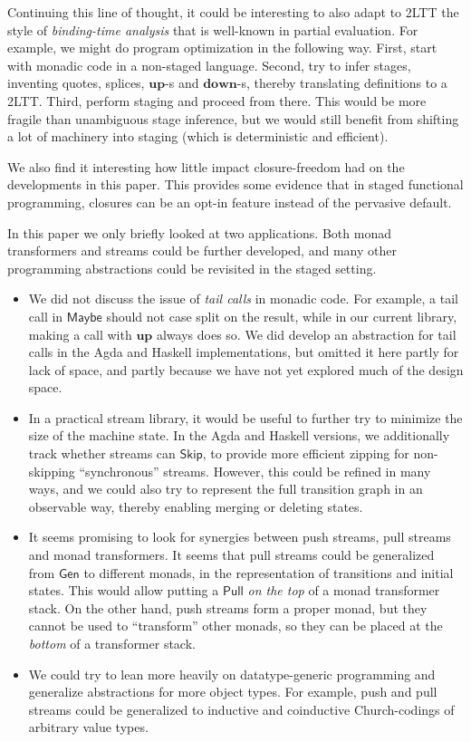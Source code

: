 \documentclass[acmsmall,screen,review,anonymous]{acmart}
\newcommand{\msf}[1]{{\mathsf{#1}}}
\newcommand{\mbf}[1]{{\mathbf{#1}}}
\newcommand{\Maybe}{\msf{Maybe}}
\theoremstyle{remark}
\newcommand{\mup}{\mbf{up}}
\newcommand{\mdown}{\mbf{down}}
\newcommand{\Gen}{\msf{Gen}}
\newcommand{\Skip}{\msf{Skip}}
\newcommand{\Pull}{\msf{Pull}}
\begin{document}
Continuing this line of thought, it could be interesting to also adapt to 2LTT
the style of \emph{binding-time analysis} that is well-known in partial
evaluation. For example, we might do program optimization in the following way.
First, start with monadic code in a non-staged language. Second, try to infer
stages, inventing quotes, splices, $\mup$-s and $\mdown$-s, thereby translating
definitions to a 2LTT. Third, perform staging and proceed from there. This would
be more fragile than unambiguous stage inference, but we would still benefit from
shifting a lot of machinery into staging (which is deterministic and efficient).

We also find it interesting how little impact closure-freedom had on the
developments in this paper. This provides some evidence that in staged
functional programming, closures can be an opt-in feature instead of the
pervasive default.

In this paper we only briefly looked at two applications. Both monad
transformers and streams could be further developed, and many other programming
abstractions could be revisited in the staged setting.
\begin{itemize}
\item
     We did not discuss the issue of \emph{tail calls} in monadic code. For
     example, a tail call in $\Maybe$ should not case split on the result, while
     in our current library, making a call with $\mup$ always does so. We did
     develop an abstraction for tail calls in the Agda and Haskell
     implementations, but omitted it here partly for lack of space, and partly
     because we have not yet explored much of the design space.

\item In a practical stream library, it would be useful to further try to
     minimize the size of the machine state. In the Agda and Haskell versions, we
     additionally track whether streams can $\Skip$, to provide more efficient
     zipping for non-skipping ``synchronous'' streams. However, this could be
     refined in many ways, and we could also try to represent the full transition
     graph in an observable way, thereby enabling merging or deleting states.

\item It seems promising to look for synergies between push streams, pull streams
     and monad transformers. It seems that pull streams could be generalized from
     $\Gen$ to different monads, in the representation of transitions and initial
     states. This would allow putting a $\Pull$ \emph{on the top} of a monad
     transformer stack. On the other hand, push streams form a proper monad, but
     they cannot be used to ``transform'' other monads, so they can be placed
     at the \emph{bottom} of a transformer stack.
\item We could try to lean more heavily on datatype-generic programming and
     generalize abstractions for more object types. For example, push and pull
     streams could be generalized to inductive and coinductive Church-codings of
     arbitrary value types.
\end{itemize}
\newpage
\end{document}
